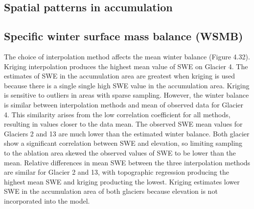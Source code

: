 \documentclass[twocolumn,letterpaper]{igs}
\begin{document}
\subsection{Spatial patterns in accumulation}


\subsection{Specific winter surface mass balance (WSMB)}

The choice of interpolation method affects the mean winter balance (Figure 4.32). Kriging
interpolation produces the highest mean value of SWE on Glacier 4. The estimates of SWE
in the accumulation area are greatest when kriging is used because there is a single single
high SWE value in the accumulation area. Kriging is sensitive to outliers in areas with sparse
sampling. However, the winter balance is similar between interpolation methods and mean
of observed data for Glacier 4. This similarity arises from the low correlation coefficient for
all methods, resulting in values closer to the data mean. The observed SWE mean values
for Glaciers 2 and 13 are much lower than the estimated winter balance. Both glacier show
a significant correlation between SWE and elevation, so limiting sampling to the ablation
area skewed the observed values of SWE to be lower than the mean. Relative differences in
mean SWE between the three interpolation methods are similar for Glacier 2 and 13, with
topographic regression producing the highest mean SWE and kriging producting the lowest.
Kriging estimates lower SWE in the accumulation area of both glaciers because elevation
is not incorporated into the model.





\end{document}
